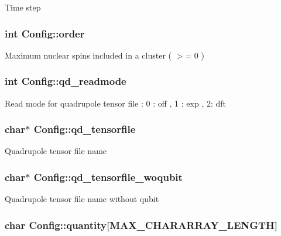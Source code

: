 Time step \hypertarget{structConfig_a3a9071ea9a9409cefb8cbcea2184c879}{
\subsubsection[{order}]{\setlength{\rightskip}{0pt plus 5cm}int Config\-::order}}\label{structConfig_a3a9071ea9a9409cefb8cbcea2184c879}
Maximum nuclear spins included in a cluster ( $>$= 0 ) \hypertarget{structConfig_adc1119b46a95084ddd4c7bfa2a8d50d9}{
\subsubsection[{qd\-\_\-readmode}]{\setlength{\rightskip}{0pt plus 5cm}int Config\-::qd\-\_\-readmode}}\label{structConfig_adc1119b46a95084ddd4c7bfa2a8d50d9}
Read mode for quadrupole tensor file \-: 0 \-: off , 1 \-: exp , 2\-: dft \hypertarget{structConfig_a91d5741035098807bc28000a003bd35d}{
\subsubsection[{qd\-\_\-tensorfile}]{\setlength{\rightskip}{0pt plus 5cm}char$\ast$ Config\-::qd\-\_\-tensorfile}}\label{structConfig_a91d5741035098807bc28000a003bd35d}
Quadrupole tensor file name \hypertarget{structConfig_a93e5666a93192db9d1cd361381d64301}{
\subsubsection[{qd\-\_\-tensorfile\-\_\-woqubit}]{\setlength{\rightskip}{0pt plus 5cm}char$\ast$ Config\-::qd\-\_\-tensorfile\-\_\-woqubit}}\label{structConfig_a93e5666a93192db9d1cd361381d64301}
Quadrupole tensor file name without qubit \hypertarget{structConfig_a408cf9618ed41aefd0b0c323f57e0730}{
\subsubsection[{quantity}]{\setlength{\rightskip}{0pt plus 5cm}char Config\-::quantity\mbox{[}M\-A\-X\-\_\-\-C\-H\-A\-R\-A\-R\-R\-A\-Y\-\_\-\-L\-E\-N\-G\-T\-H\mbox{]}}}\label{structConfig_a408cf9618ed41aefd0b0c323f57e0730}
